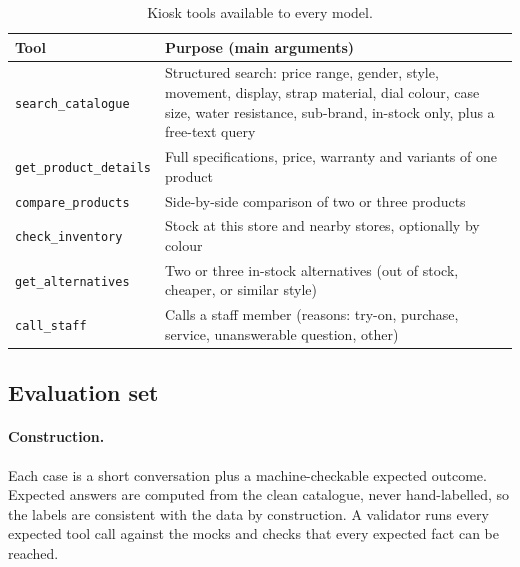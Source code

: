 \documentclass[11pt,a4paper]{article}
\begin{document}
\begin{table}[H]
\centering
\small
\begin{tabularx}{\textwidth}{l L}
\toprule
Tool & Purpose (main arguments) \\
\midrule
\texttt{search\_catalogue} & Structured search: price range, gender, style, movement, display, strap material, dial
colour, case size, water resistance, sub-brand, in-stock only, plus a free-text query \\
\texttt{get\_product\_details} & Full specifications, price, warranty and variants of one product \\
\texttt{compare\_products} & Side-by-side comparison of two or three products \\
\texttt{check\_inventory} & Stock at this store and nearby stores, optionally by colour \\
\texttt{get\_alternatives} & Two or three in-stock alternatives (out of stock, cheaper, or similar style) \\
\texttt{call\_staff} & Calls a staff member (reasons: try-on, purchase, service, unanswerable question, other) \\
\bottomrule
\end{tabularx}
\caption{Kiosk tools available to every model.}
\label{tab:tools}
\end{table}

\subsection{Evaluation set}\label{sec:evalset}
\paragraph{Construction.} Each case is a short conversation plus a machine-checkable expected outcome. Expected answers
are computed from the clean catalogue, never hand-labelled, so the labels are consistent with the data by construction.
A validator runs every expected tool call against the mocks and checks that every expected fact can be reached.
\end{document}
